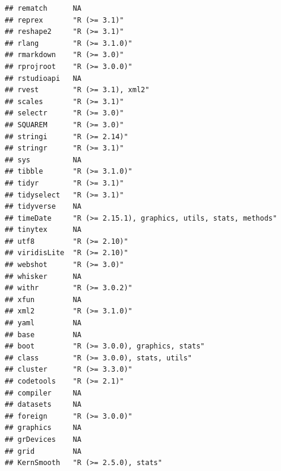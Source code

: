 \documentclass[]{article}
\begin{document}
\begin{verbatim}
## rematch      NA                                               
## reprex       "R (>= 3.1)"                                     
## reshape2     "R (>= 3.1)"                                     
## rlang        "R (>= 3.1.0)"                                   
## rmarkdown    "R (>= 3.0)"                                     
## rprojroot    "R (>= 3.0.0)"                                   
## rstudioapi   NA                                               
## rvest        "R (>= 3.1), xml2"                               
## scales       "R (>= 3.1)"                                     
## selectr      "R (>= 3.0)"                                     
## SQUAREM      "R (>= 3.0)"                                     
## stringi      "R (>= 2.14)"                                    
## stringr      "R (>= 3.1)"                                     
## sys          NA                                               
## tibble       "R (>= 3.1.0)"                                   
## tidyr        "R (>= 3.1)"                                     
## tidyselect   "R (>= 3.1)"                                     
## tidyverse    NA                                               
## timeDate     "R (>= 2.15.1), graphics, utils, stats, methods" 
## tinytex      NA                                               
## utf8         "R (>= 2.10)"                                    
## viridisLite  "R (>= 2.10)"                                    
## webshot      "R (>= 3.0)"                                     
## whisker      NA                                               
## withr        "R (>= 3.0.2)"                                   
## xfun         NA                                               
## xml2         "R (>= 3.1.0)"                                   
## yaml         NA                                               
## base         NA                                               
## boot         "R (>= 3.0.0), graphics, stats"                  
## class        "R (>= 3.0.0), stats, utils"                     
## cluster      "R (>= 3.3.0)"                                   
## codetools    "R (>= 2.1)"                                     
## compiler     NA                                               
## datasets     NA                                               
## foreign      "R (>= 3.0.0)"                                   
## graphics     NA                                               
## grDevices    NA                                               
## grid         NA                                               
## KernSmooth   "R (>= 2.5.0), stats"                            

\end{verbatim}
\end{document}
